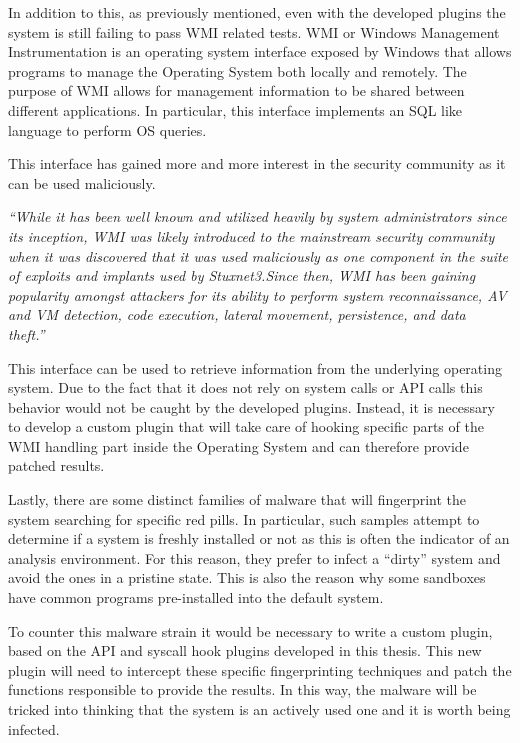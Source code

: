 In addition to this, as previously mentioned, even with the developed plugins the system is still failing to pass WMI related tests. WMI or Windows Management Instrumentation is an operating system interface exposed by Windows that allows programs to manage the Operating System both locally and remotely. The purpose of WMI allows for management information to be shared between different applications. In particular, this interface implements an SQL like language to perform OS queries.

This interface has gained more and more interest in the security community as it can be used maliciously. 

\textit{``While it has been well known and utilized heavily by system administrators since its inception, WMI was likely introduced to the mainstream security community when it was discovered that it was used maliciously as one component in the suite of exploits and implants used by Stuxnet3.Since then, WMI has been gaining popularity amongst attackers for its ability to perform system reconnaissance, AV and VM detection, code execution, lateral movement, persistence, and data theft.''}~\cite{wmi}


This interface can be used to retrieve information from the underlying operating system. Due to the fact that it does not rely on system calls or API calls this behavior would not be caught by the developed plugins. Instead, it is necessary to develop a custom plugin that will take care of hooking specific parts of the WMI handling part inside the Operating System and can therefore provide patched results. 


Lastly, there are some distinct families of malware that will fingerprint the system searching for specific red pills. In particular, such samples attempt to determine if a system is freshly installed or not as this is often the indicator of an analysis environment. For this reason, they prefer to infect a ``dirty'' system and avoid the ones in a pristine state. This is also the reason why some sandboxes have common programs pre-installed into the default system.

To counter this malware strain it would be necessary to write a custom plugin, based on the API and syscall hook plugins developed in this thesis. This new plugin will need to intercept these specific fingerprinting techniques and patch the functions responsible to provide the results. In this way, the malware will be tricked into thinking that the system is an actively used one and it is worth being infected. 